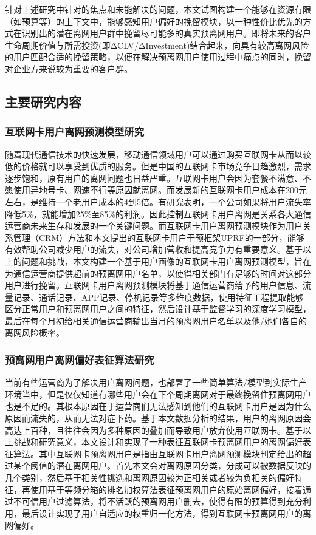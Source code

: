 针对上述研究中针对的焦点和未能解决的问题，本文试图构建一个能够在资源有限（如预算等）的上下文中，能够感知用户偏好的挽留模块，以一种性价比优先的方式在识别出的潜在离网用户群中挽留尽可能多的真实预离网用户。即将未来的客户生命周期价值与所需投资(即ΔCLV/ΔInvestment)结合起来，向具有较高离网风险的用户匹配合适的挽留策略，以便在解决预离网用户使用过程中痛点的同时，挽留对企业方来说较为重要的客户群。


\subsection{主要研究内容}
\subsubsection{互联网卡用户离网预测模型研究}
随着现代通信技术的快速发展，移动通信领域用户可以通过购买互联网卡从而以较低的价格就可以享受到优质的服务。但是中国的互联网卡市场竞争日趋激烈，需求逐步饱和，原有用户的离网问题也日益严重。互联网卡用户会因为套餐不满意、不愿使用异地号卡、网速不行等原因就离网。而发展新的互联网卡用户成本在200元左右，是维持一个老用户成本的4到5倍。有研究表明，一个公司如果将用户流失率降低5\%，就能增加25\%至85\%的利润。因此控制互联网卡用户离网是关系各大通信运营商未来生存和发展的一个关键问题。而互联网卡用户离网预测模块作为用户关系管理（CRM）方法和本文提出的互联网卡用户干预框架UPRF的一部分，能够有效帮助公司减少用户的流失，对公司增加营收和提高竞争力有重要意义。基于以上的问题和挑战，本文构建一个基于用户画像的互联网卡用户离网预测模型，旨在为通信运营商提供超前的预离网用户名单，以使得相关部门有足够的时间对这部分用户进行挽留。互联网卡用户离网预测模块将基于通信运营商给予的用户信息、流量记录、通话记录、APP记录、停机记录等多维度数据，使用特征工程提取能够区分正常用户和预离网用户之间的特征，然后设计基于监督学习的深度学习模型，最后在每个月初给相关通信运营商输出当月的预离网用户名单以及他/她们各自的离网风险概率。

\subsubsection{预离网用户离网偏好表征算法研究}
当前有些运营商为了解决用户离网问题，也部署了一些简单算法/模型到实际生产环境当中，但是仅仅知道有哪些用户会在下个周期离网对于最终挽留住预离网用户也是不足的。其根本原因在于运营商们无法感知到他们的互联网卡用户是因为什么原因而流失的，从而无法对症下药。基于本文数据分析的结果，用户的离网原因会高达上百种，且往往会因为多种原因的叠加而导致用户放弃使用互联网卡。基于以上挑战和研究意义，本文设计和实现了一种表征互联网卡预离网用户的离网偏好表征算法。其中互联网卡预离网用户是指由互联网卡用户离网预测模块判定给出的超过某个阈值的潜在离网用户。首先本文会对离网原因分类，分成可以被数据反映的几个类别，然后基于相关性挑选和离网原因较为正相关或者较为负相关的偏好特征，再使用基于等频分箱的排名加权算法表征预离网用户的原始离网偏好，接着通过不可信用户过滤算法，将不活跃的预离网用户删去，使得有限的预算得到充分利用，最后设计实现了用户自适应的权重归一化方法，得到互联网卡预离网用户的离网偏好。

